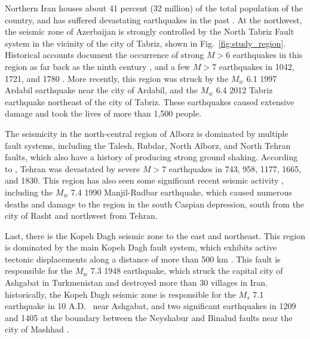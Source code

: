 Northern Iran houses about 41 percent (32 million) of the total population of the country, and has suffered devastating earthquakes in the past \citep[e.g.,][]{Mehrain_1990_Tech, Chafory-Ashtiany_1999_DPM, Razzaghi_2012_Tech}. At the northwest, the seismic zone of Azerbaijan is strongly controlled by the North Tabriz Fault system in the vicinity of the city of Tabriz, shown in Fig.~\ref{fig:study_region}. Historical accounts document the occurrence of strong $M>6$ earthquakes in this region as far back as the ninth century \citep{Berberian1999}, and a few $M>7$ earthquakes in 1042, 1721, and 1780 \citep{Jones1834}. More recently, this region was struck by the $M_w$ 6.1 1997 Ardabil earthquake near the city of Ardabil, and the $M_w$ 6.4 2012 Tabriz earthquake northeast of the city of Tabriz. These earthquakes caused extensive damage and took the lives of more than 1,500 people. 

The seismicity in the north-central region of Alborz is dominated by multiple fault systems, including the Talesh, Rubdar, North Alborz, and North Tehran faults, which also have a history of producing strong ground shaking. According to \citet{Ambraseys_1982_Book}, Tehran was devastated by severe $M>7$ earthquakes in 743, 958, 1177, 1665, and 1830. This region has also seen some significant recent seismic activity \citep{Berberian1999}, including the $M_w$ 7.4 1990 Manjil-Rudbar earthquake, which caused numerous deaths and damage to the region in the south Caspian depression, south from the city of Rasht and northwest from Tehran. 

Last, there is the Kopeh Dagh seismic zone to the east and northeast. This region is dominated by the main Kopeh Dagh fault system, which exhibits active tectonic displacements along a distance of more than 500 km \citep{Trifonov1978}. This fault is responsible for the $M_w$ 7.3 1948 earthquake, which struck the capital city of Ashgabat in Turkmenistan and destroyed more than 30 villages in Iran.  historically, the Kopeh Dagh seismic zone is responsible for the $M_s$ 7.1 earthquake in 10 A.D.~\citep{Berberian2001} near Ashgabat, and two significant earthquakes in 1209 and 1405 at the boundary between the Neyshabur and Binalud faults near the city of Mashhad \citep{Berberian1999}.

